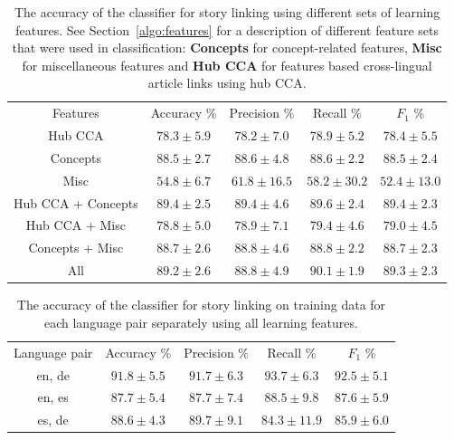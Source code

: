 \begin{table}[t]
\caption[Story linking accuracy for several feature sets]{The accuracy of the classifier for story linking using different sets of learning features. 
See Section~\ref{algo:features} for a description of different feature sets that were used in classification: \textbf{Concepts} for concept-related features,
\textbf{Misc} for miscellaneous features and \textbf{Hub CCA} for features based cross-lingual article links using hub CCA.}
\begin{center}
\begin{tabular}{|c|c|c|c|c|}
  \hline
  \cline{1-5}
  Features & Accuracy \% & Precision \% & Recall \% & $F_1$ \%  \\ \cline{1-5}
  Hub CCA            & $78.3 \pm 5.9$ & $78.2 \pm  7.0$ & $78.9 \pm  5.2$ & $78.4 \pm  5.5$ \\ \cline{1-5}
  Concepts           & $88.5 \pm 2.7$ & $88.6 \pm  4.8$ & $88.6 \pm  2.2$ & $88.5 \pm  2.4$ \\ \cline{1-5}
  Misc               & $54.8 \pm 6.7$ & $61.8 \pm 16.5$ & $58.2 \pm 30.2$ & $52.4 \pm 13.0$ \\ \cline{1-5}
  Hub CCA + Concepts & $89.4 \pm 2.5$ & $89.4 \pm  4.6$ & $89.6 \pm  2.4$ & $89.4 \pm  2.3$ \\ \cline{1-5}
  Hub CCA + Misc     & $78.8 \pm 5.0$ & $78.9 \pm  7.1$ & $79.4 \pm  4.6$ & $79.0 \pm  4.5$ \\ \cline{1-5}
  Concepts + Misc    & $88.7 \pm 2.6$ & $88.8 \pm  4.6$ & $88.8 \pm  2.2$ & $88.7 \pm  2.3$ \\ \cline{1-5}
  All                & $89.2 \pm 2.6$ & $88.8 \pm  4.9$ & $90.1 \pm  1.9$ & $89.3 \pm  2.3$ \\ \cline{1-5}
  \hline
\end{tabular}
\end{center}
\label{table:linkingEval}
\end{table}

\begin{table}[t]
\caption[Story linking accuracy for several language pairs]{The accuracy of the classifier for story linking on training data for each language pair separately using all learning features.}
\begin{center}
\begin{tabular}{|c|c|c|c|c|}
  \hline
  \cline{1-5}
  Language pair & Accuracy \% & Precision \% & Recall \% & $F_1$ \% \\ \cline{1-5}
  en, de & $91.8 \pm 5.5$ & $91.7 \pm  6.3$ & $93.7 \pm  6.3$ & $92.5 \pm  5.1$ \\ \cline{1-5}
  en, es & $87.7 \pm 5.4$ & $87.7 \pm  7.4$ & $88.5 \pm  9.8$ & $87.6 \pm  5.9$ \\ \cline{1-5}
  es, de & $88.6 \pm 4.3$ & $89.7 \pm  9.1$ & $84.3 \pm 11.9$ & $85.9 \pm  6.0$ \\ \cline{1-5}
  \hline
\end{tabular}
\end{center}
\label{table:langPairEval}
\end{table}

